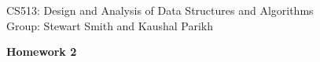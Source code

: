 \documentclass[11pt]{article}
\begin{document}

\noindent CS513: Design and Analysis of Data Structures and Algorithms \\
Group: Stewart Smith and Kaushal Parikh\\

\begin{center}
    \LARGE{\textbf{Homework 2}}\\
\end{center}

\vspace{.1in}


\begin{enumerate}


\end{enumerate}
\end{document}
